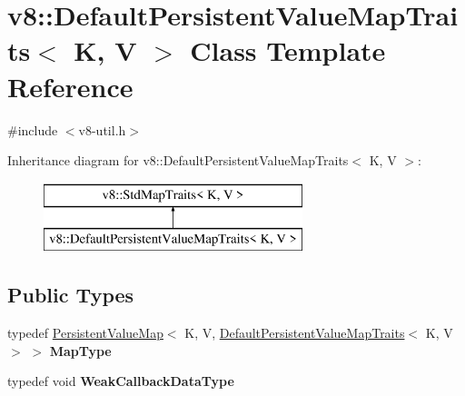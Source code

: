 \hypertarget{classv8_1_1_default_persistent_value_map_traits}{}\section{v8\+:\+:Default\+Persistent\+Value\+Map\+Traits$<$ K, V $>$ Class Template Reference}
\label{classv8_1_1_default_persistent_value_map_traits}


{\ttfamily \#include $<$v8-\/util.\+h$>$}

Inheritance diagram for v8\+:\+:Default\+Persistent\+Value\+Map\+Traits$<$ K, V $>$\+:\begin{figure}[H]
\begin{center}
\leavevmode
\includegraphics[height=2.000000cm]{classv8_1_1_default_persistent_value_map_traits}
\end{center}
\end{figure}
\subsection*{Public Types}
\begin{DoxyCompactItemize}
\item 
typedef \hyperlink{classv8_1_1_persistent_value_map}{Persistent\+Value\+Map}$<$ K, V, \hyperlink{classv8_1_1_default_persistent_value_map_traits}{Default\+Persistent\+Value\+Map\+Traits}$<$ K, V $>$ $>$ {\bfseries Map\+Type}\hypertarget{classv8_1_1_default_persistent_value_map_traits_a05cbd536d6bb9ba4949198351e074854}{}\label{classv8_1_1_default_persistent_value_map_traits_a05cbd536d6bb9ba4949198351e074854}

\item 
typedef void {\bfseries Weak\+Callback\+Data\+Type}\hypertarget{classv8_1_1_default_persistent_value_map_traits_a379f8c42e727a9576fb0954bb0245d8f}{}\label{classv8_1_1_default_persistent_value_map_traits_a379f8c42e727a9576fb0954bb0245d8f}

\end{DoxyCompactItemize}
